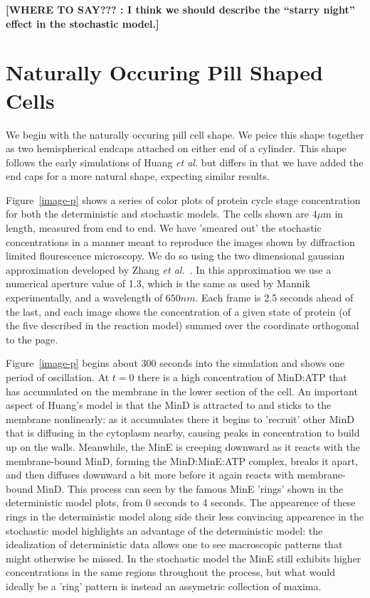 \documentclass[letterpaper,twocolumn,amsmath,amssymb,pre]{revtex4-1}
\newcommand{\red}[1]{{\bf \color{red} #1}}
\newcommand{\fixme}[1]{\red{[#1]}}
\newcommand\micron{\ensuremath{\mu\text{m}}}
\begin{document}
\fixme{WHERE TO SAY??? : I think we should describe the ``starry
  night'' effect in the stochastic model.}

\section{Naturally Occuring Pill Shaped Cells}

We begin with the naturally occuring pill cell shape.  We peice this
shape together as two hemispherical endcaps attached on either end of
a cylinder.  This shape follows the early simulations of Huang
\emph{et al.} but differs in that we have added the end caps for a
more natural shape, expecting similar results.

Figure~\ref{image-p} shows a series of color plots of protein cycle
stage concentration for both the deterministic and stochastic
models. The cells shown are $4\micron$ in length, measured from end to
end.  We have 'smeared out' the stochastic concentrations in a manner
meant to reproduce the images shown by diffraction limited
flourescence microscopy.  We do so using the two dimensional gaussian
approximation developed by Zhang \emph{et
  al.}~\cite{zhang2007gaussian}.  In this approximation we use a
numerical aperture value of 1.3, which is the same as used by Mannik
experimentally, and a wavelength of $650nm$.  Each frame is 2.5
seconds ahead of the last, and each image shows the concentration of a
given state of protein (of the five described in the reaction model)
summed over the coordinate orthogonal to the page.

Figure~\ref{image-p} begins about 300 seconds into the simulation and
shows one period of oscillation.  At $t=0$ there is a high
concentration of MinD:ATP that has accumulated on the membrane in the
lower section of the cell. An important aspect of Huang's model is
that the MinD is attracted to and sticks to the membrane nonlinearly:
as it accumulates there it begins to 'recruit' other MinD that is
diffusing in the cytoplasm nearby, causing peaks in concentration to
build up on the walls.  Meanwhile, the MinE is creeping downward as it
reacts with the membrane-bound MinD, forming the MinD:MinE:ATP
complex, breaks it apart, and then diffuses downward a bit more before
it again reacts with membrane-bound MinD.  This process can seen by
the famous MinE 'rings' shown in the deterministic model plots, from 0
seconds to 4 seconds.  The appearence of these rings in the
deterministic model along side their less convincing appearence in the
stochastic model highlights an advantage of the deterministic model:
the idealization of deterministic data allows one to see macroscopic
patterns that might otherwise be missed.  In the stochastic model the
MinE still exhibits higher concentrations in the same regions
throughout the process, but what would ideally be a 'ring' pattern is
instead an assymetric collection of maxima.
\end{document}
